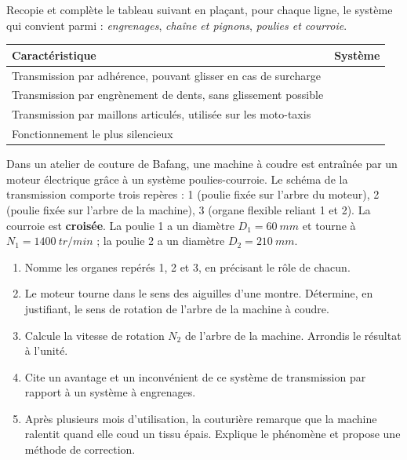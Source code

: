 \documentclass[11pt]{article}
\newcounter{popsec}
\newcounter{popsub}
\newcommand{\courssub}[1]{%
  \stepcounter{popsub}%
  \par\vspace{9pt}\noindent{\popxbold\fontsize{11.5}{13}\selectfont\color{popink}{\color{poporange}\thepopsec.\thepopsub}\hspace{6pt}#1}\par\nopagebreak\vspace{4pt}
}
\begin{document}
\begin{exercice}
Recopie et complète le tableau suivant en plaçant, pour chaque ligne, le système qui convient parmi : \emph{engrenages}, \emph{chaîne et pignons}, \emph{poulies et courroie}.
\begin{center}
\begin{tabularx}{\linewidth}{|X|l|}
\hline
\rowcolor{popblueL} \textbf{Caractéristique} & \textbf{Système} \\
\hline
Transmission par adhérence, pouvant glisser en cas de surcharge & \\
\hline
Transmission par engrènement de dents, sans glissement possible & \\
\hline
Transmission par maillons articulés, utilisée sur les moto-taxis & \\
\hline
Fonctionnement le plus silencieux & \\
\hline
\end{tabularx}
\end{center}
\end{exercice}

\courssub{Je me prépare au BEPC}

\begin{exercice}
Dans un atelier de couture de Bafang, une machine à coudre est entraînée par un moteur électrique grâce à un système poulies-courroie. Le schéma de la transmission comporte trois repères : 1 (poulie fixée sur l'arbre du moteur), 2 (poulie fixée sur l'arbre de la machine), 3 (organe flexible reliant 1 et 2). La courroie est \textbf{croisée}. La poulie 1 a un diamètre $D_1 = \SI{60}{mm}$ et tourne à $N_1 = \SI{1400}{tr/min}$ ; la poulie 2 a un diamètre $D_2 = \SI{210}{mm}$.
\begin{enumerate}
\item Nomme les organes repérés 1, 2 et 3, en précisant le rôle de chacun.
\item Le moteur tourne dans le sens des aiguilles d'une montre. Détermine, en justifiant, le sens de rotation de l'arbre de la machine à coudre.
\item Calcule la vitesse de rotation $N_2$ de l'arbre de la machine. Arrondis le résultat à l'unité.
\item Cite un avantage et un inconvénient de ce système de transmission par rapport à un système à engrenages.
\item Après plusieurs mois d'utilisation, la couturière remarque que la machine ralentit quand elle coud un tissu épais. Explique le phénomène et propose une méthode de correction.
\end{enumerate}
\end{exercice}
\end{document}
